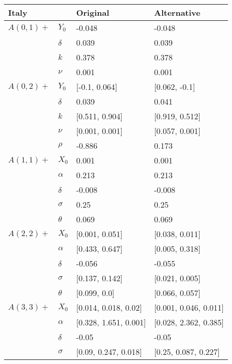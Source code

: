 \begin{tabular}{llll}
	\toprule
	Italy&       &               Original &            Alternative \\
	\midrule
	$A(0, 1)+$ & $Y_0$ &                 -0.048 &                 -0.048 \\
	& $\delta$ &                  0.039 &                  0.039 \\
	&  $k$ &                  0.378 &                  0.378 \\
	&  $\nu$ &                  0.001 &                  0.001 \\
	$A(0, 2)+$ & $Y_0$ &          [-0.1, 0.064] &          [0.062, -0.1] \\
	& $\delta$ &                  0.039 &                  0.041 \\
	& $k$ &         [0.511, 0.904] &         [0.919, 0.512] \\
	& $\nu$ &         [0.001, 0.001] &         [0.057, 0.001] \\
	& $\rho$ &                 -0.886 &                  0.173 \\
	$A(1, 1)+$ & $X_0$ &                  0.001 &                  0.001 \\
	& $\alpha$ &                  0.213 &                  0.213 \\
	& $\delta$ &                 -0.008 &                 -0.008 \\
	& $\sigma$ &                   0.25 &                   0.25 \\
	& $\theta$ &                  0.069 &                  0.069 \\
	$A(2, 2)+$ & $X_0$ &         [0.001, 0.051] &         [0.038, 0.011] \\
	& $\alpha$ &         [0.433, 0.647] &         [0.005, 0.318] \\
	& $\delta$ &                 -0.056 &                 -0.055 \\
	& $\sigma$ &         [0.137, 0.142] &         [0.021, 0.005] \\
	& $\theta$ &           [0.099, 0.0] &         [0.066, 0.057] \\
	$A(3, 3)+$ & $X_0$ &   [0.014, 0.018, 0.02] &  [0.001, 0.046, 0.011] \\
	& $\alpha$ &  [0.328, 1.651, 0.001] &  [0.028, 2.362, 0.385] \\
	& $\delta$ &                  -0.05 &                  -0.05 \\
	& $\sigma$ &   [0.09, 0.247, 0.018] &   [0.25, 0.087, 0.227] \\

\end{tabular}
